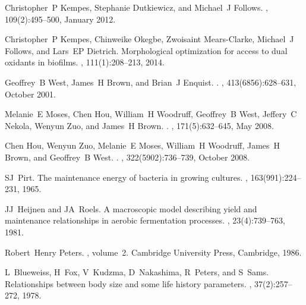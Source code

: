 \documentclass[twocolumn,preprintnumbers,amsmath,amssymb,superscriptaddress]{revtex4}
\begin{document}
\begin{bibunit}[unsrt]

\begin{thebibliography}{10}

Christopher~P Kempes, Stephanie Dutkiewicz, and Michael~J Follows.
, 109(2):495--500, January 2012.

Christopher~P Kempes, Chinweike Okegbe, Zwoisaint Mears-Clarke, Michael~J
  Follows, and Lars~EP Dietrich.
\newblock Morphological optimization for access to dual oxidants in biofilms.
,
  111(1):208--213, 2014.

Geoffrey~B West, James~H Brown, and Brian~J Enquist.
.
, 413(6856):628--631, October 2001.

Melanie~E Moses, Chen Hou, William~H Woodruff, Geoffrey~B West, Jeffery~C
  Nekola, Wenyun Zuo, and James~H Brown.
.
,
  171(5):632--645, May 2008.

Chen Hou, Wenyun Zuo, Melanie~E Moses, William~H Woodruff, James~H Brown, and
  Geoffrey~B West.
.
, 322(5902):736--739, October 2008.

SJ~Pirt.
\newblock The maintenance energy of bacteria in growing cultures.
, 163(991):224--231, 1965.

JJ~Heijnen and JA~Roels.
\newblock A macroscopic model describing yield and maintenance relationships in
  aerobic fermentation processes.
, 23(4):739--763, 1981.

Robert~Henry Peters.
, volume~2.
\newblock Cambridge University Press, Cambridge, 1986.

L~Blueweiss, H~Fox, V~Kudzma, D~Nakashima, R~Peters, and S~Sams.
\newblock Relationships between body size and some life history parameters.
, 37(2):257--272, 1978.


\end{thebibliography}
\end{bibunit}
\end{document}
